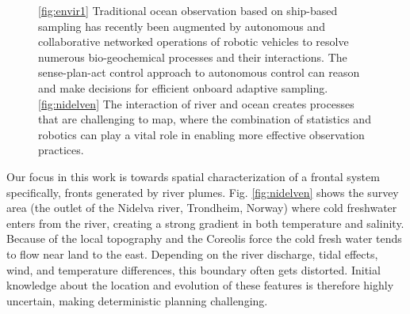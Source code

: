 \documentclass[aoas]{imsart}
\begin{document}
\begin{figure}[!h] 
  \centering 
  \hfill
  \caption{\ref{fig:envir1} Traditional ocean observation based on
    ship-based sampling has recently been augmented by autonomous and
    collaborative networked operations of robotic vehicles to resolve
    numerous bio-geochemical processes and their interactions. The
    sense-plan-act control approach to autonomous control can reason
    and make decisions for efficient onboard adaptive sampling.
    \ref{fig:nidelven} The interaction of river and ocean creates
    processes that are challenging to map, where the combination of
    statistics and robotics can play a vital role in enabling more
    effective observation practices.}
\label{fig:envir}
\end{figure}

Our focus in this work is towards spatial characterization of a
frontal system specifically, fronts generated by river
plumes. Fig. \ref{fig:nidelven} shows the survey area (the outlet of
the Nidelva river, Trondheim, Norway) where cold freshwater enters
from the river, creating a strong gradient in both temperature and
salinity. Because of the local topography and the Coreolis force
\citep{coriolis1835memoire} the cold fresh water tends to flow near
land to the east. Depending on the river discharge, tidal effects,
wind, and temperature differences, this boundary often gets
distorted. Initial knowledge about the location and evolution of these
features is therefore highly uncertain, making deterministic planning
challenging.
\end{document}
